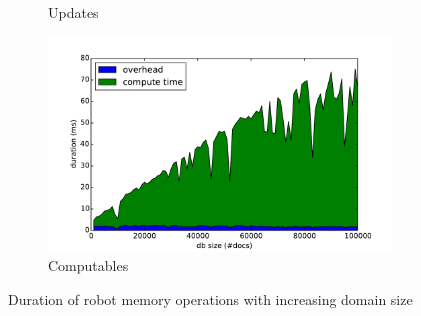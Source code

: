 \begin{figure}[ht!]
\begin{subfigure}[b]{0.49\textwidth}
    \caption{Updates}
    \label{fig:update-durations}
  \end{subfigure}
  \begin{subfigure}[b]{0.49\textwidth}
    \hspace{-3mm}
    \includegraphics[width=1.15\textwidth]{plots/computable-durations}
    \caption{Computables}
    \label{fig:computable-durations}
  \end{subfigure}
  \caption[Duration of robot memory operations with increasing domain size]{Duration of robot memory operations with increasing domain size}
  \label{fig:eval-durations-1}
\end{figure}

